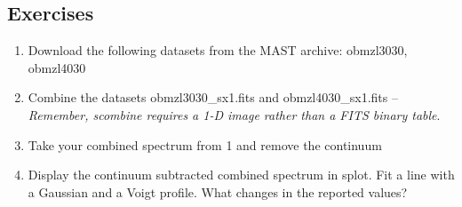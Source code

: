\subsection{Exercises}
\begin{enumerate}

\item Download the following datasets from the MAST archive: obmzl3030, obmzl4030
\item Combine the datasets obmzl3030\_sx1.fits and obmzl4030\_sx1.fits -- \emph{Remember, scombine requires a 1-D image rather than a FITS binary table}.
\item Take your combined spectrum from 1 and remove the continuum
\item Display the continuum subtracted combined spectrum in splot. Fit a line with a Gaussian and a Voigt profile. What changes in the reported values?
\end{enumerate}